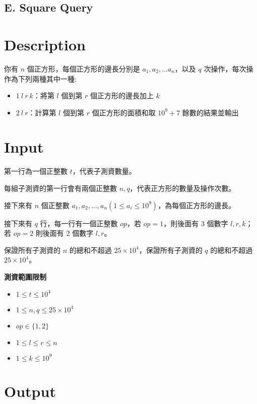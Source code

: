 \documentclass[11pt,a4paper]{article}
\begin{document}
\begin{center}
\section*{E. Square Query}
\end{center}

\section*{Description}


你有 $n$ 個正方形，每個正方形的邊長分別是 $a_1, a_2, \ldots a_n$，以及 $q$ 次操作，每次操作為下列兩種其中一種:

\begin{itemize}
  \item $1\ l\ r\ k$：將第 $l$ 個到第 $r$ 個正方形的邊長加上 $k$
  \item $2\ l\ r$：計算第 $l$ 個到第 $r$ 個正方形的面積和取 $10^9+7$ 餘數的結果並輸出
\end{itemize}



\section*{Input}

第一行為一個正整數 $t$，代表子測資數量。

每組子測資的第一行會有兩個正整數 $n,q$，代表正方形的數量及操作次數。

接下來有 $n$ 個正整數 $a_1,a_2,\ldots,a_n(1\le a_i\le 10^9)$，為每個正方形的邊長。

接下來有 $q$ 行，每一行有一個正整數 $op$，若 $op=1$，則後面有 $3$ 個數字 $l, r, k$；若 $op=2$ 則後面有 $2$ 個數字 $l, r$。

保證所有子測資的 $n$ 的總和不超過 $25\times 10^4$，保證所有子測資的 $q$ 的總和不超過 $25\times 10^4$。

\textbf{測資範圍限制}
\begin{itemize}
  \item $1 \le t \le 10^4$
  \item $1\le n,q\le 25\times 10^4$
  \item $op \in \{1, 2\}$
  \item $1\le l\le r\le n$
  \item $1\le k\le 10^9$
\end{itemize}

\section*{Output}
\end{document}
